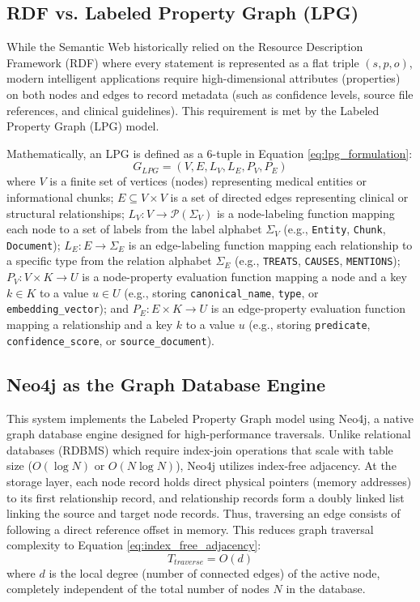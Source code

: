 \documentclass[../main.tex]{subfiles}
\begin{document}
\subsection{RDF vs. Labeled Property Graph (LPG)}

While the Semantic Web historically relied on the Resource Description Framework (RDF) where every statement is represented as a flat triple $(s, p, o)$, modern intelligent applications require high-dimensional attributes (properties) on both nodes and edges to record metadata (such as confidence levels, source file references, and clinical guidelines). This requirement is met by the Labeled Property Graph (LPG) model. 

Mathematically, an LPG is defined as a 6-tuple in Equation \eqref{eq:lpg_formulation}:
\begin{equation}\label{eq:lpg_formulation}
G_{LPG} = (V, E, L_V, L_E, P_V, P_E)
\end{equation}
where $V$ is a finite set of vertices (nodes) representing medical entities or informational chunks; $E \subseteq V \times V$ is a set of directed edges representing clinical or structural relationships; $L_V: V \rightarrow \mathcal{P}(\Sigma_V)$ is a node-labeling function mapping each node to a set of labels from the label alphabet $\Sigma_V$ (e.g., \texttt{Entity}, \texttt{Chunk}, \texttt{Document}); $L_E: E \rightarrow \Sigma_E$ is an edge-labeling function mapping each relationship to a specific type from the relation alphabet $\Sigma_E$ (e.g., \texttt{TREATS}, \texttt{CAUSES}, \texttt{MENTIONS}); $P_V: V \times K \rightarrow U$ is a node-property evaluation function mapping a node and a key $k \in K$ to a value $u \in U$ (e.g., storing \texttt{canonical\_name}, \texttt{type}, or \texttt{embedding\_vector}); and $P_E: E \times K \rightarrow U$ is an edge-property evaluation function mapping a relationship and a key $k$ to a value $u$ (e.g., storing \texttt{predicate}, \texttt{confidence\_score}, or \texttt{source\_document}).


\subsection{Neo4j as the Graph Database Engine}

This system implements the Labeled Property Graph model using Neo4j, a native graph database engine designed for high-performance traversals. Unlike relational databases (RDBMS) which require index-join operations that scale with table size ($O(\log N)$ or $O(N \log N)$), Neo4j utilizes index-free adjacency. At the storage layer, each node record holds direct physical pointers (memory addresses) to its first relationship record, and relationship records form a doubly linked list linking the source and target node records. Thus, traversing an edge consists of following a direct reference offset in memory. This reduces graph traversal complexity to Equation \eqref{eq:index_free_adjacency}:
\begin{equation}\label{eq:index_free_adjacency}
T_{traverse} = O(d)
\end{equation}
where $d$ is the local degree (number of connected edges) of the active node, completely independent of the total number of nodes $N$ in the database.
\end{document}
